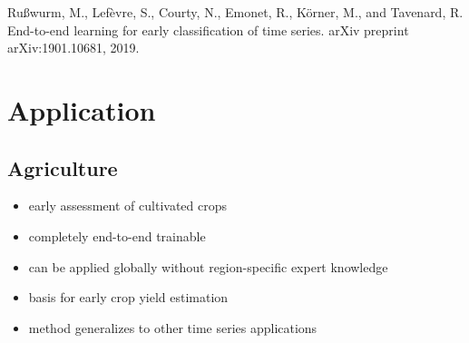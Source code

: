 \documentclass[a0]{tumposter}
\begin{document}
\begin{minipage}[t]{.65\textwidth}
\begin{minipage}[t]{.49\textwidth}
	
	
	\end{minipage}

	{\tiny 
	Rußwurm, M., Lefèvre, S., Courty, N., Emonet, R., Körner, M., and Tavenard, R. End-to-end learning for early classification of time series. arXiv preprint arXiv:1901.10681, 2019.
	\par
	}

	
	\section{Application}
	
	\begin{minipage}[t]{.5\textwidth}
	\subsection{Agriculture}
	
	\begin{itemize}
		\item early assessment of cultivated crops
		\item completely end-to-end trainable
		\item can be applied globally without region-specific expert knowledge
		\item basis for early crop yield estimation
		\item method generalizes to other time series applications
	\end{itemize}

	\end{minipage}
	\begin{minipage}[t]{.5\textwidth}

\end{minipage}
\end{minipage}
\end{document}
